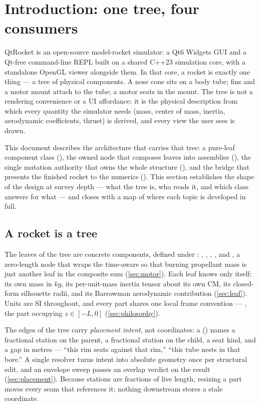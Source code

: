 \section{Introduction: one tree, four consumers}\label{sec:intro}

QtRocket is an open-source model-rocket simulator: a Qt6 Widgets GUI and a Qt-free command-line
REPL built on a shared C++23 simulation core, with a standalone OpenGL viewer alongside them. In
that core, a rocket is exactly one thing --- a tree of physical components. A nose cone sits on a
body tube; fins and a motor mount attach to the tube; a motor seats in the mount. The tree is not a
rendering convenience or a UI affordance: it is the physical description from which every quantity
the simulator needs (mass, center of mass, inertia, aerodynamic coefficients, thrust) is derived,
and every view the user sees is drawn.

This document describes the architecture that carries that tree: a pure-leaf component class
(), the owned node that composes leaves into assemblies (), the single
mutation authority that owns the whole structure (), and the bridge that presents
the finished rocket to the numerics (). This section establishes the shape of the
design at survey depth --- what the tree is, who reads it, and which class answers for what --- and
closes with a map of where each topic is developed in full.

\subsection{A rocket is a tree}\label{sec:intro-tree}

The leaves of the tree are concrete components, defined under :
, , , , and , a
zero-length node that wraps the time-aware  so that burning propellant mass is
just another leaf in the composite sum (\cref{sec:motor}). Each leaf knows only itself: its own
mass in $\unit{kg}$, its per-unit-mass inertia tensor about its own CM, its closed-form silhouette
radii, and its Barrowman aerodynamic contribution (\cref{sec:leaf}). Units are SI throughout, and
every part shares one local frame convention --- \zfwd, the part occupying $z \in [-L, 0]$
(\cref{sec:philosophy}).

The edges of the tree carry \emph{placement intent}, not coordinates: a 
() names a fractional station on the parent, a fractional
station on the child, a seat kind, and a gap in metres --- ``this rim seats against that rim,''
``this tube nests in that bore.'' A single resolver turns intent into absolute geometry once per
structural edit, and an envelope sweep passes an overlap verdict on the result (\cref{sec:placement}). Because
stations are fractions of live length, resizing a part moves every seam that references it; nothing
downstream stores a stale coordinate.

